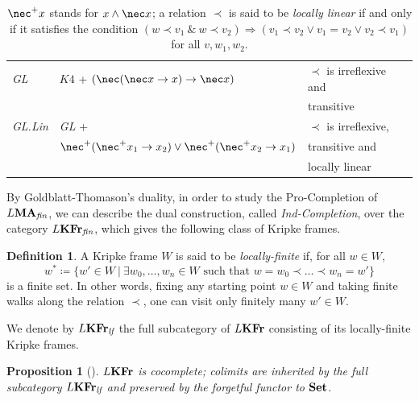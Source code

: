 \documentclass{article}
\newtheorem{prop}{Proposition}
\theoremstyle{definition}
\newtheorem{defn}{Definition}
\newtheorem{rem}{Remark}
\newcommand{\KFr}{\textup{\textbf{KFr}}}
\newcommand{\MA}{\textup{\textbf{MA}}}
\newcommand{\fin}{\textit{fin}}
\newcommand{\lf}{\textit{lf}}
\newcommand{\Set}{\textup{\textbf{Set}}}
\begin{document}
\begin{table}
\begin{tabular}{||l|l|l||}
 \emph{GL}        &   $K4$ + $(\nec (\nec x \to x) \to \nec x)$ & $\prec$ is irreflexive and \\
                  &                                               &  transitive    \\
                                             \hline
  \emph{GL.Lin}        &   \emph{GL} +  & $\prec$ is irreflexive,  \\
                  &      $\nec^+ (\nec^+ x_1 \to x_2) \vee \nec^+ (\nec^+ x_2 \to x_1)$       & transitive and \\
    &   & locally linear \\
                                             \hline
\end{tabular}
\caption{$\nec^+ x$ stands for $x \wedge \nec x$; a relation $\prec$ is said to be \emph{locally linear} if and only if it satisfies the condition $(w\prec v_1 ~\&~ w\prec v_2) \Rightarrow ( v_1\prec v_2 \vee v_1=v_2 \vee v_2\prec v_1)$ for all $v,w_1,w_2$.}
\end{table}

 
By Goldblatt-Thomason's duality, in order to study the Pro-Completion of $L\MA_\fin$, we can describe the dual construction, called \emph{Ind-Completion}, over the category $L\KFr_\fin$, which gives the following class of Kripke frames.
\begin{defn}
A Kripke frame $W$ is said to be \emph{locally-finite} if, for all $w \in W$,
$$w^* \coloneqq \{w' \in W\ \vert\ \exists w_0,\dots,w_n \in W \text{ such that } w=w_0 \prec \dots \prec w_n=w'\}$$
is a finite set. In other words, fixing any starting point $w \in W$ and taking finite walks along the relation $\prec$, one can visit only finitely many $w' \in W$.
\end{defn}
We denote by $L\KFr_\lf$ the full subcategory of $L\KFr$ consisting of its locally-finite Kripke frames.



\begin{prop}[\cite{MDB-SG}]\label{prop:colim}
$L\KFr$ is cocomplete; colimits are inherited by the full subcategory $L\KFr_\lf$ and preserved by the forgetful functor to $\Set$. 
\end{prop}
\end{document}
